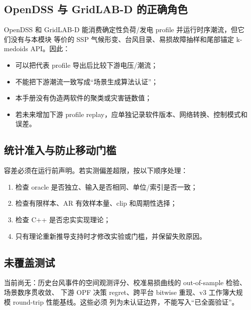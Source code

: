 \subsection{OpenDSS 与 GridLAB-D 的正确角色}
OpenDSS 和 GridLAB-D 能消费确定性负荷/发电 profile 并运行时序潮流，但它们没有与本模块
等价的 SSP 气候形变、台风目录、易损故障抽样和尾部锚定 k-medoids API。因此：
\begin{itemize}
  \item 可以把代表 profile 导出后比较下游电压/潮流；
  \item 不能把下游潮流一致写成“场景生成算法认证”；
  \item 本手册没有伪造两软件的聚类或灾害链数值；
  \item 若未来增加下游 profile replay，应单独记录软件版本、网络转换、控制模式和误差。
\end{itemize}

\subsection{统计准入与防止移动门槛}
容差必须在运行前声明。若实测偏差超限，按以下顺序处理：
\begin{enumerate}
  \item 检查 oracle 是否独立、输入是否相同、单位/索引是否一致；
  \item 检查有限样本、AR 有效样本量、clip 和周期性选择；
  \item 检查 C++ 是否忠实实现理论；
  \item 只有理论重新推导支持时才修改实验或门槛，并保留失败原因。
\end{enumerate}

\subsection{未覆盖测试}
当前尚无：历史台风事件的空间观测评分、校准易损曲线的 out-of-sample 检验、场景数序贯收敛、
下游 OPF 决策 regret、跨平台 bitwise 重现、v3 工作簿大规模 round-trip 性能基线。这些必须
列为未认证边界，不能写入“已全面验证”。

